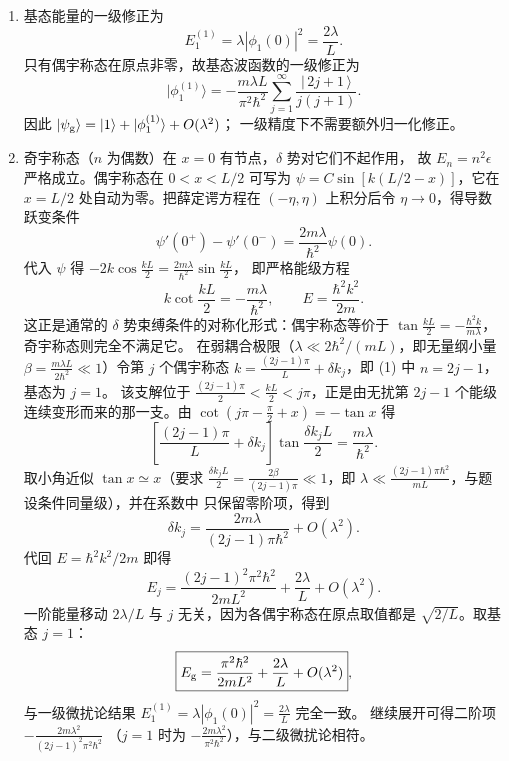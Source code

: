 \begin{enumerate}
{\begin{enumerate}
		\item 基态能量的一级修正为
		\[
			\boxed{E_1^{(1)}=\lambda|\phi_1(0)|^2=\frac{2\lambda}{L}}.
		\]
		只有偶宇称态在原点非零，故基态波函数的一级修正为
		\[
			\boxed{|\phi_1^{(1)}\rangle
			=-\frac{m\lambda L}{\pi^2\hbar^2}
			\sum_{j=1}^{\infty}\frac{|\,2j+1\,\rangle}{j(j+1)}}.
		\]
		因此 $|\psi_{\rm g}\rangle=|1\rangle+|\phi_1^{(1)}\rangle+O(\lambda^2)$；
		一级精度下不需要额外归一化修正。

		\item 奇宇称态（$n$ 为偶数）在 $x=0$ 有节点，$\delta$ 势对它们不起作用，
		故 $E_n=n^2\epsilon$ 严格成立。偶宇称态在 $0<x<L/2$ 可写为
		$\psi=C\sin[k(L/2-x)]$，它在 $x=L/2$ 处自动为零。把薛定谔方程在
		$(-\eta,\eta)$ 上积分后令 $\eta\to0$，得导数跃变条件
		\[
			\psi'(0^+)-\psi'(0^-)=\frac{2m\lambda}{\hbar^2}\psi(0).
		\]
		代入 $\psi$ 得 $-2k\cos\frac{kL}{2}=\frac{2m\lambda}{\hbar^2}\sin\frac{kL}{2}$，
		即严格能级方程
		\[
			\boxed{k\cot\frac{kL}{2}=-\frac{m\lambda}{\hbar^2}},\qquad
			E=\frac{\hbar^2k^2}{2m}.
		\]
		这正是通常的 $\delta$ 势束缚条件的对称化形式：偶宇称态等价于
		$\tan\frac{kL}{2}=-\frac{\hbar^2k}{m\lambda}$，奇宇称态则完全不满足它。
		在弱耦合极限（$\lambda\ll2\hbar^2/(mL)$，即无量纲小量
		$\beta=\frac{m\lambda L}{2\hbar^2}\ll1$）令第 $j$ 个偶宇称态
		$k=\frac{(2j-1)\pi}{L}+\delta k_j$，即 (1) 中 $n=2j-1$，基态为 $j=1$。
		该支解位于 $\frac{(2j-1)\pi}{2}<\frac{kL}{2}<j\pi$，正是由无扰第
		$2j-1$ 个能级连续变形而来的那一支。由
		$\cot\left(j\pi-\frac{\pi}{2}+x\right)=-\tan x$ 得
		\[
			\left[\frac{(2j-1)\pi}{L}+\delta k_j\right]
			\tan\frac{\delta k_jL}{2}=\frac{m\lambda}{\hbar^2}.
		\]
		取小角近似 $\tan x\simeq x$（要求
		$\frac{\delta k_jL}{2}=\frac{2\beta}{(2j-1)\pi}\ll1$，即
		$\lambda\ll\frac{(2j-1)\pi\hbar^2}{mL}$，与题设条件同量级），并在系数中
		只保留零阶项，得到
		\[
			\delta k_j=\frac{2m\lambda}{(2j-1)\pi\hbar^2}+O(\lambda^2).
		\]
		代回 $E=\hbar^2k^2/2m$ 即得
		\[
			E_j=\frac{(2j-1)^2\pi^2\hbar^2}{2mL^2}+\frac{2\lambda}{L}+O(\lambda^2).
		\]
		一阶能量移动 $2\lambda/L$ 与 $j$ 无关，因为各偶宇称态在原点取值都是
		$\sqrt{2/L}$。取基态 $j=1$：
		\[
			\boxed{E_{\rm g}=\frac{\pi^2\hbar^2}{2mL^2}+\frac{2\lambda}{L}+O(\lambda^2)},
		\]
		与一级微扰论结果 $E_1^{(1)}=\lambda|\phi_1(0)|^2=\frac{2\lambda}{L}$ 完全一致。
		继续展开可得二阶项 $-\frac{2m\lambda^2}{(2j-1)^2\pi^2\hbar^2}$
		（$j=1$ 时为 $-\frac{2m\lambda^2}{\pi^2\hbar^2}$），与二级微扰论相符。
	\end{enumerate}
}



\end{enumerate}
